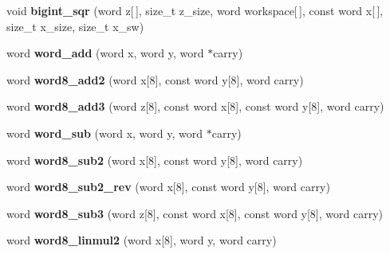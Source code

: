 \begin{DoxyCompactItemize}
\item 
\hypertarget{namespaceBotan_a25723c26b9f1fc0a21e4dac4a6f5bbe3}{void {\bfseries bigint\-\_\-sqr} (word z\mbox{[}$\,$\mbox{]}, size\-\_\-t z\-\_\-size, word workspace\mbox{[}$\,$\mbox{]}, const word x\mbox{[}$\,$\mbox{]}, size\-\_\-t x\-\_\-size, size\-\_\-t x\-\_\-sw)}\label{namespaceBotan_a25723c26b9f1fc0a21e4dac4a6f5bbe3}

\item 
\hypertarget{namespaceBotan_aadf18b236a09407a575bc44df6581ba1}{word {\bfseries word\-\_\-add} (word x, word y, word $\ast$carry)}\label{namespaceBotan_aadf18b236a09407a575bc44df6581ba1}

\item 
\hypertarget{namespaceBotan_a5898d196aabbdf38c74b7f03b52cfb76}{word {\bfseries word8\-\_\-add2} (word x\mbox{[}8\mbox{]}, const word y\mbox{[}8\mbox{]}, word carry)}\label{namespaceBotan_a5898d196aabbdf38c74b7f03b52cfb76}

\item 
\hypertarget{namespaceBotan_a82aa291d5f3438ec4c380a86eb8893a6}{word {\bfseries word8\-\_\-add3} (word z\mbox{[}8\mbox{]}, const word x\mbox{[}8\mbox{]}, const word y\mbox{[}8\mbox{]}, word carry)}\label{namespaceBotan_a82aa291d5f3438ec4c380a86eb8893a6}

\item 
\hypertarget{namespaceBotan_a111b44a20862b5c882c6e916c5b74126}{word {\bfseries word\-\_\-sub} (word x, word y, word $\ast$carry)}\label{namespaceBotan_a111b44a20862b5c882c6e916c5b74126}

\item 
\hypertarget{namespaceBotan_a2438179f85074db546171eeddcff9bef}{word {\bfseries word8\-\_\-sub2} (word x\mbox{[}8\mbox{]}, const word y\mbox{[}8\mbox{]}, word carry)}\label{namespaceBotan_a2438179f85074db546171eeddcff9bef}

\item 
\hypertarget{namespaceBotan_ac91e1138f9d281c77c89f1ecc892e717}{word {\bfseries word8\-\_\-sub2\-\_\-rev} (word x\mbox{[}8\mbox{]}, const word y\mbox{[}8\mbox{]}, word carry)}\label{namespaceBotan_ac91e1138f9d281c77c89f1ecc892e717}

\item 
\hypertarget{namespaceBotan_a04d94b0082a82368807a32080797a845}{word {\bfseries word8\-\_\-sub3} (word z\mbox{[}8\mbox{]}, const word x\mbox{[}8\mbox{]}, const word y\mbox{[}8\mbox{]}, word carry)}\label{namespaceBotan_a04d94b0082a82368807a32080797a845}

\item 
\hypertarget{namespaceBotan_a6c98a507837662f72fde19b95fe17410}{word {\bfseries word8\-\_\-linmul2} (word x\mbox{[}8\mbox{]}, word y, word carry)}\label{namespaceBotan_a6c98a507837662f72fde19b95fe17410}


\end{DoxyCompactItemize}
